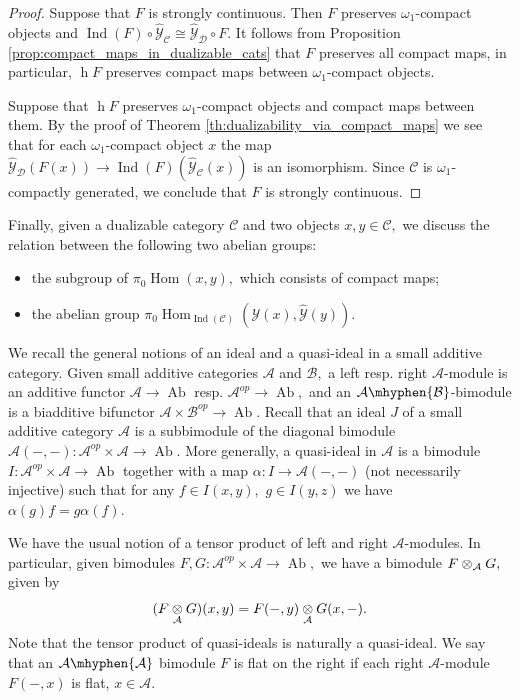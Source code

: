 \documentclass[11pt,leqno]{amsart}
\numberwithin{equation}{section}
\def\h{\operatorname{h}}
\def\Hom{\operatorname{Hom}}
\newcommand{\tens}[1]{%
  \mathbin{\mathop{\otimes}\displaylimits_{#1}}%
}
\newcommand{\hy}{\mhyphen}
\newcommand{\cD}{{\mathcal D}}
\newcommand{\cA}{{\mathcal A}}
\newcommand{\cB}{{\mathcal B}}
\newcommand{\cC}{{\mathcal C}}
\newcommand{\cY}{{\mathcal Y}}
\newcommand{\Ab}{\operatorname{Ab}}
\newcommand{\Ind}{\operatorname{Ind}}
\begin{document}
\begin{proof}Suppose that $F$ is strongly continuous. Then $F$ preserves $\omega_1$-compact objects and $\Ind(F)\circ\hat{\cY}_{\cC}\cong \hat{\cY}_{\cD}\circ F.$ It follows from Proposition \ref{prop:compact_maps_in_dualizable_cats} that $F$ preserves all compact maps, in particular, $\h F$ preserves compact maps between $\omega_1$-compact objects.

Suppose that $\h F$ preserves $\omega_1$-compact objects and compact maps between them. By the proof of Theorem \ref{th:dualizability_via_compact_maps} we see that for each $\omega_1$-compact object $x$ the map $\hat{\cY}_{\cD}(F(x))\to\Ind(F)(\hat{\cY}_{\cC}(x))$ is an isomorphism. Since $\cC$ is $\omega_1$-compactly generated, we conclude that $F$ is strongly continuous.
\end{proof}

Finally, given a dualizable category $\cC$ and two objects $x,y\in\cC,$ we discuss the relation between the following two abelian groups:

\begin{itemize}
\item the subgroup of $\pi_0\Hom(x,y),$ which consists of compact maps;

\item the abelian group $\pi_0\Hom_{\Ind(\cC)}(\cY(x),\hat{\cY}(y)).$ 
\end{itemize}

We recall the general notions of an ideal and a quasi-ideal in a small additive category. Given small additive categories $\cA$ and $\cB,$ a left resp. right $\cA$-module is an additive functor $\cA\to\Ab$ resp. $\cA^{op}\to\Ab,$ and an $\cA\hy\cB$-bimodule is a biadditive bifunctor $\cA\times\cB^{op}\to\Ab.$ Recall that an ideal $J$ of a small additive category $\cA$ is a subbimodule of the diagonal bimodule $\cA(-,-):\cA^{op}\times\cA\to\Ab.$ More generally, a quasi-ideal in $\cA$ is a bimodule $I:\cA^{op}\times\cA\to \Ab$ together with a map $\alpha:I\to\cA(-,-)$ (not necessarily injective) such that for any $f\in I(x,y),$ $g\in I(y,z)$ we have $\alpha(g)f=g\alpha(f).$

We have the usual notion of a tensor product of left and right $\cA$-modules. In particular, given bimodules $F,G:\cA^{op}\times\cA\to\Ab,$ we have a bimodule $F\tens{\cA} G,$ given by $$(F\tens{\cA} G)(x,y)=F(-,y)\tens{\cA}G(x,-).$$ Note that the tensor product of quasi-ideals is naturally a quasi-ideal. We say that an $\cA\hy\cA$ bimodule $F$ is flat on the right if each right $\cA$-module $F(-,x)$ is flat, $x\in\cA.$
\end{document}
